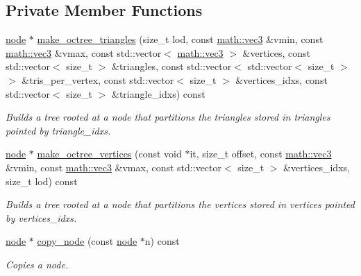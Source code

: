\subsection*{Private Member Functions}
\begin{DoxyCompactItemize}
\item 
\hyperlink{structphysim_1_1structures_1_1octree_1_1node}{node} $\ast$ \hyperlink{classphysim_1_1structures_1_1octree_a7891cdfc782b4a6026167d692783306e}{make\+\_\+octree\+\_\+triangles} (size\+\_\+t lod, const \hyperlink{structphysim_1_1math_1_1vec3}{math\+::vec3} \&vmin, const \hyperlink{structphysim_1_1math_1_1vec3}{math\+::vec3} \&vmax, const std\+::vector$<$ \hyperlink{structphysim_1_1math_1_1vec3}{math\+::vec3} $>$ \&vertices, const std\+::vector$<$ size\+\_\+t $>$ \&triangles, const std\+::vector$<$ std\+::vector$<$ size\+\_\+t $>$ $>$ \&tris\+\_\+per\+\_\+vertex, const std\+::vector$<$ size\+\_\+t $>$ \&vertices\+\_\+idxs, const std\+::vector$<$ size\+\_\+t $>$ \&triangle\+\_\+idxs) const
\begin{DoxyCompactList}\small\item\em Builds a tree rooted at a node that partitions the triangles stored in {\itshape triangles} pointed by {\itshape triangle\+\_\+idxs}. \end{DoxyCompactList}\item 
\hyperlink{structphysim_1_1structures_1_1octree_1_1node}{node} $\ast$ \hyperlink{classphysim_1_1structures_1_1octree_a47755b22ab1c4231a1c2bcf7b5ef2fe9}{make\+\_\+octree\+\_\+vertices} (const void $\ast$it, size\+\_\+t offset, const \hyperlink{structphysim_1_1math_1_1vec3}{math\+::vec3} \&vmin, const \hyperlink{structphysim_1_1math_1_1vec3}{math\+::vec3} \&vmax, const std\+::vector$<$ size\+\_\+t $>$ \&vertices\+\_\+idxs, size\+\_\+t lod) const
\begin{DoxyCompactList}\small\item\em Builds a tree rooted at a node that partitions the vertices stored in {\itshape vertices} pointed by {\itshape vertices\+\_\+idxs}. \end{DoxyCompactList}\item 
\hyperlink{structphysim_1_1structures_1_1octree_1_1node}{node} $\ast$ \hyperlink{classphysim_1_1structures_1_1octree_a2c4f254c7dfac0ed6f0ee4197e1bdeac}{copy\+\_\+node} (const \hyperlink{structphysim_1_1structures_1_1octree_1_1node}{node} $\ast$n) const
\begin{DoxyCompactList}\small\item\em Copies a node. \end{DoxyCompactList}\item 

\end{DoxyCompactItemize}
